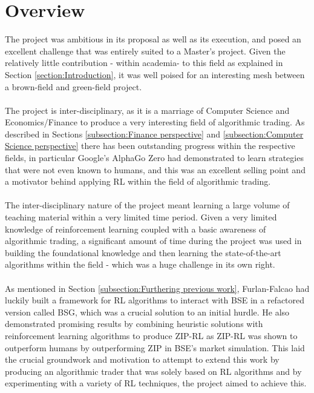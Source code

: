 \documentclass[ %
                    author={Ashwinder Khurana},
                supervisor={Prof Dave Cliff},
                    degree={MEng},
                     title={The Deeply Reinforced Trader},
                  subtitle={},
                      type={enterprise},
                      year={2020} ]{dissertation}
\begin{document}
{\section{Overview}
The project was ambitious in its proposal as well as its execution, and posed an excellent challenge that was entirely suited to a Master's project. Given the relatively little contribution - within academia-  to this field as explained in Section \ref{section:Introduction}, it was well poised for an interesting mesh between a brown-field and green-field project.
\\
\\
The project is inter-disciplinary, as it is a marriage of Computer Science and Economics/Finance to produce a very interesting field of algorithmic trading. As described in Sections \ref{subsection:Finance perspective} and \ref{subsection:Computer Science perspective} there has been outstanding progress within the respective fields, in particular Google's AlphaGo Zero had demonstrated to learn strategies that were not even known to humans, and this was an excellent selling point and a motivator behind applying RL within the field of algorithmic trading.
\\
\\
The inter-disciplinary nature of the project meant learning a large volume of teaching material within a very limited time period. Given a very limited knowledge of reinforcement learning coupled with a basic awareness of algorithmic trading, a significant amount of time during the project was used in building the foundational knowledge and then learning the state-of-the-art algorithms within the field - which was a huge challenge in its own right. 
\\
\\
As mentioned in Section \ref{subsection:Furthering previous work}, Furlan-Falcao had luckily built a framework for RL algorithms to interact with BSE in a refactored version called BSG, which was a crucial solution to an initial hurdle. He also demonstrated promising results by combining heuristic solutions with reinforcement learning algorithms to produce ZIP-RL as ZIP-RL was shown to outperform humans by outperforming ZIP in BSE's market simulation. This laid the crucial groundwork and motivation to attempt to extend this work by producing an algorithmic trader that was solely based on RL algorithms and by experimenting with a variety of RL techniques, the project aimed to achieve this. 

}
\end{document}
